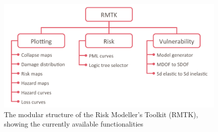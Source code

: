 \begin{figure}[!htbp]
	\centering
	\includegraphics[width=\textwidth]{figures/rmtk_structure.png}
	\caption{The modular structure of the Risk Modeller's Toolkit (RMTK), showing the currently available functionalities}
	\label{fig:rmtk-structure}
\end{figure}